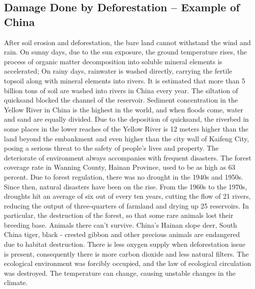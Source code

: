 \documentclass{book}\usepackage{knitr}
\begin{document}
\begin{knitrout}
\begin{kframe}
{\section{Damage Done by Deforestation – Example of China}
After soil erosion and deforestation, the bare land cannot withstand the wind and rain. On sunny days, due to the sun exposure, the ground temperature rises, the process of organic matter decomposition into soluble mineral elements is accelerated; On rainy days, rainwater is washed directly, carrying the fertile topsoil along with mineral elements into rivers. It is estimated that more than 5 billion tons of soil are washed into rivers in China every year. The siltation of quicksand blocked the channel of the reservoir. Sediment concentration in the Yellow River in China is the highest in the world, and when floods come, water and sand are equally divided. Due to the deposition of quicksand, the riverbed in some places in the lower reaches of the Yellow River is 12 meters higher than the land beyond the embankment and even higher than the city wall of Kaifeng City, posing a serious threat to the safety of people's lives and property.
The deteriorate of environment always accompanies with frequent disasters. The forest coverage rate in Wanning County, Hainan Province, used to be as high as 63 percent. Due to forest regulation, there was no drought in the 1940s and 1950s. Since then, natural disasters have been on the rise. From the 1960s to the 1970s, droughts hit an average of six out of every ten years, cutting the flow of 21 rivers, reducing the output of three-quarters of farmland and drying up 25 reservoirs. In particular, the destruction of the forest, so that some rare animals lost their breeding base. Animals there can't survive. China's Hainan slope deer, South China tiger, black - crested gibbon and other precious animals are endangered due to habitat destruction. There is less oxygen supply when deforestation issue is present, consequently there is more carbon dioxide and less natural filters. The ecological environment was forcibly occupied, and the law of ecological circulation was destroyed. The temperature can change, causing unstable changes in the climate.

}
\end{kframe}
\end{knitrout}
\end{document}
